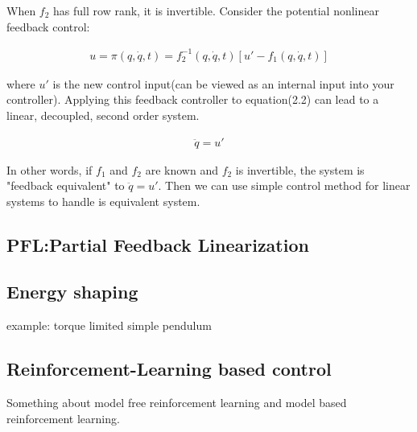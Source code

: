 When \(f_2\) has full row rank, it is invertible. Consider the potential nonlinear feedback control:

\begin{align}
 u = \pi(q, \dot{q}, t) = f_2^{-1}(q, \dot{q}, t) [u' - f_1(q, \dot{q}, t)]
\end{align}

where \(u'\) is the new control input(can be viewed as an internal input into your controller). Applying this feedback controller to equation(2.2) can lead to a linear, decoupled, second order system.

\begin{align}
  \ddot{q} = u' 
\end{align}

In other words, if \(f_1\) and \(f_2\) are known and \(f_2\) is invertible, the system is "feedback equivalent" to \(\ddot{q} = u' \). Then we can use simple control method for linear systems to handle is equivalent system.

\subsection{PFL:Partial Feedback Linearization}

\subsection{Energy shaping}
example: torque limited simple pendulum

\subsection{Reinforcement-Learning based control}
Something about model free reinforcement learning and model based reinforcement learning.


\cleardoublepage
